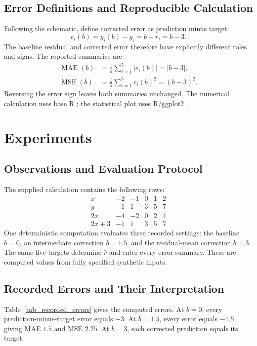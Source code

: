 \documentclass[11pt]{article}
\begin{document}
\subsection{Error Definitions and Reproducible Calculation}

Following the schematic, define corrected error as prediction minus target:
\[
e_i(b)=\hat y_i(b)-y_i=b-r_i=b-3.
\]
The baseline residual and corrected error therefore have explicitly different roles and signs. The reported summaries are
\begin{align}
\operatorname{MAE}(b)
&=\frac{1}{5}\sum_{i=1}^{5}|e_i(b)|=|b-3|,\\
\operatorname{MSE}(b)
&=\frac{1}{5}\sum_{i=1}^{5}e_i(b)^2=(b-3)^2.
\end{align}
Reversing the error sign leaves both summaries unchanged. The numerical calculation uses base R \cite{Ihaka1996RLanguage}; the statistical plot uses R/ggplot2 \cite{Wickham2009LayeredGrammar}.

\section{Experiments}
\subsection{Observations and Evaluation Protocol}

The supplied calculation contains the following rows:
\[
\begin{array}{c|rrrrr}
x & -2 & -1 & 0 & 1 & 2\\
y & -1 & 1 & 3 & 5 & 7\\
2x & -4 & -2 & 0 & 2 & 4\\
2x+3 & -1 & 1 & 3 & 5 & 7
\end{array}
\]
One deterministic computation evaluates three recorded settings: the baseline $b=0$, an intermediate correction $b=1.5$, and the residual-mean correction $b=3$. The same five targets determine $\bar r$ and enter every error summary. These are computed values from fully specified synthetic inputs.

\subsection{Recorded Errors and Their Interpretation}

Table~\ref{tab_recorded_errors} gives the computed errors. At $b=0$, every prediction-minus-target error equals $-3$. At $b=1.5$, every error equals $-1.5$, giving MAE $1.5$ and MSE $2.25$. At $b=3$, each corrected prediction equals its target.
\end{document}
